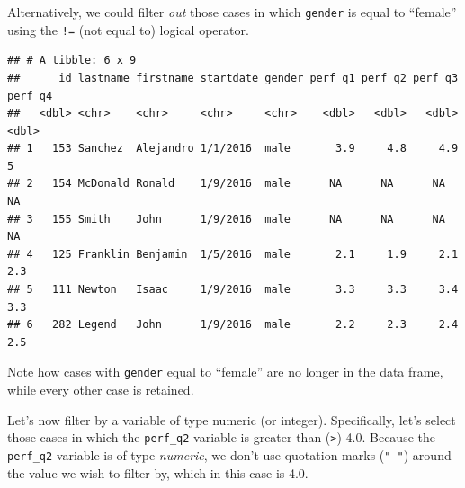 \documentclass[]{book}
\newenvironment{Shaded}{\begin{snugshade}}{\end{snugshade}}
\newcommand{\KeywordTok}[1]{\textcolor[rgb]{0.13,0.29,0.53}{\textbf{#1}}}
\newcommand{\FloatTok}[1]{\textcolor[rgb]{0.00,0.00,0.81}{#1}}
\newcommand{\StringTok}[1]{\textcolor[rgb]{0.31,0.60,0.02}{#1}}
\newcommand{\CommentTok}[1]{\textcolor[rgb]{0.56,0.35,0.01}{\textit{#1}}}
\newcommand{\OperatorTok}[1]{\textcolor[rgb]{0.81,0.36,0.00}{\textbf{#1}}}
\newcommand{\NormalTok}[1]{#1}
\begin{document}
Alternatively, we could filter \emph{out} those cases in which
\texttt{gender} is equal to ``female'' using the \texttt{!=} (not equal
to) logical operator.

\begin{Shaded}
\end{Shaded}

\begin{verbatim}
## # A tibble: 6 x 9
##      id lastname firstname startdate gender perf_q1 perf_q2 perf_q3 perf_q4
##   <dbl> <chr>    <chr>     <chr>     <chr>    <dbl>   <dbl>   <dbl>   <dbl>
## 1   153 Sanchez  Alejandro 1/1/2016  male       3.9     4.8     4.9     5  
## 2   154 McDonald Ronald    1/9/2016  male      NA      NA      NA      NA  
## 3   155 Smith    John      1/9/2016  male      NA      NA      NA      NA  
## 4   125 Franklin Benjamin  1/5/2016  male       2.1     1.9     2.1     2.3
## 5   111 Newton   Isaac     1/9/2016  male       3.3     3.3     3.4     3.3
## 6   282 Legend   John      1/9/2016  male       2.2     2.3     2.4     2.5
\end{verbatim}

Note how cases with \texttt{gender} equal to ``female'' are no longer in
the data frame, while every other case is retained.

Let's now filter by a variable of type numeric (or integer).
Specifically, let's select those cases in which the \texttt{perf\_q2}
variable is greater than (\texttt{\textgreater{}}) 4.0. Because the
\texttt{perf\_q2} variable is of type \emph{numeric}, we don't use
quotation marks (\texttt{"\ "}) around the value we wish to filter by,
which in this case is 4.0.

\begin{Shaded}
\end{Shaded}
\end{document}
